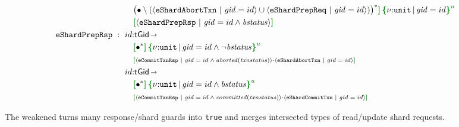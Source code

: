 {\begin{align*}
  \\ & \quad \SNegStarU{\msg{eShardAbortTxn}{\I{gid}=id}}{\msg{eShardPrepReq}{\I{gid}=id}} \effR{}\,\urt{\Code{unit}}{\I{gid}=id}\, 
  \\ & \quad \effL{} \msg{eShardPrepRsp}{\I{gid}=id\land\mathit{bstatus}} \effR{}
  \\
  \eff{eShardPrepRsp} ~:~{}
  & id{:}\mathsf{tGid} \sarr {}
  \\ & \quad \effL{} \allA \effR{}\,\urt{\Code{unit}}{\I{gid}=id\land\neg\mathit{bstatus}}\, 
  \\ & \quad {\scriptsize \effL{} \msg{eCommitTxnRsp}{\I{gid}=id\allowbreak\land\mathit{aborted}(\I{txnstatus})}\seqA\allowbreak\msg{eShardAbortTxn}{\I{gid}=id} \effR{}}
  \\
  & id{:}\mathsf{tGid} \sarr {}
  \\ & \quad \effL{} \allA \effR{}\,\urt{\Code{unit}}{\I{gid}=id\land\mathit{bstatus}}\, 
  \\ & \quad {\scriptsize \effL{} \msg{eCommitTxnRsp}{\I{gid}=id\allowbreak\land\mathit{committed}(\I{txnstatus})}\seqA\allowbreak\msg{eShardCommitTxn}{\I{gid}=id} \effR{}}
\end{align*}}
\vspace{-.4cm}\par\nobreak\noindent
The weakened \tyName{} turns many response/shard guards into \texttt{true} and merges intersected types of read/update shard requests.
